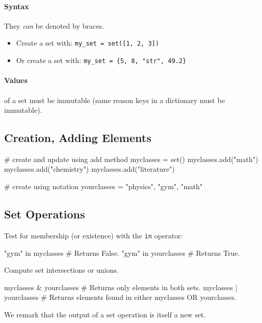 \documentclass[12pt,letterpaper,twoside]{article}
\begin{document}
\vspace{-3ex}
\paragraph{Syntax}
They \emph{can} be denoted by braces.

\vspace{-2ex}
\begin{itemize}
\item
  Create a set with: \texttt{my\_set\ =\ set({[}1,\ 2,\ 3{]})}
\item
  Or create a set with: \texttt{my\_set\ =\ \{5,\ 8,\ "str",\ 49.2\}}
\end{itemize}

\paragraph{Values} of a set must be immutable (same reason keys in a
  dictionary must be immutable).

\subsection{Creation, Adding Elements}

\begin{python}
# create and update using add method
myclasses = set()
myclasses.add("math")
myclasses.add("chemistry")
myclasses.add("literature")

# create using {} notation
yourclasses = {"physics", "gym", "math"}
\end{python}

\subsection{Set Operations}
Test for membership (or existence) with the \texttt{in} operator:

\begin{python}
"gym" in myclasses     # Returns False.
"gym" in yourclasses   # Returns True.
\end{python}

Compute set intersections or unions.

\begin{python}
myclasses & yourclasses  # Returns only elements in both sets.
myclasses | yourclasses  # Returns elements found in either myclasses OR yourclasses.
\end{python}

We remark that the output of a set operation is itself a new set.
\end{document}
